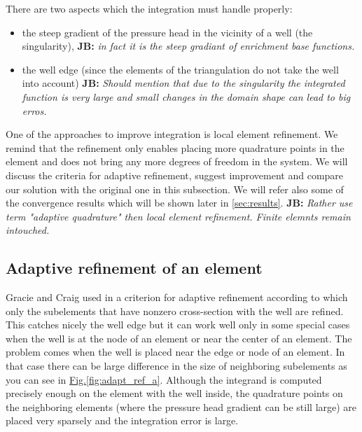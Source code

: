 \documentclass[preprint,12pt]{elsarticle}
\newcommand{\fig}[1]{\hyperref[#1]{Fig.\ref{#1}}}
\newcommand{\noteJB}[1]{{\color{Blue} \textbf{JB: } \textit{#1}}}
\newcommand{\notePE}[1]{{\color{Orange} \textbf{PE: } \textit{#1}}}
\begin{document}
There are two aspects which the integration must handle properly:
\begin{itemize}
  \item the steep gradient of the pressure head in the vicinity of a well (the singularity),
  \noteJB{in fact it is the steep gradiant of enrichment base functions.}
  \item the well edge (since the elements of the triangulation do not take the well into account)
  \noteJB{Should mention that due to the singularity the integrated function is very large and small changes in the domain shape can lead to big erros.}
\end{itemize}

One of the approaches to improve integration is local element refinement. We remind that the refinement only enables
placing more quadrature points in the element and does not bring any more degrees of freedom in the 
system. We will discuss the criteria for adaptive refinement, suggest improvement and compare our solution
with the original one in this subsection. We will refer also some of the convergence results which will be 
shown later in \ref{sec:results}.
\noteJB{Rather use term "adaptive quadrature" then local element refinement. Finite elemnts remain intouched.}

\subsection{Adaptive refinement of an element}
\label{sec:refinement_element}

Gracie and Craig used in \cite{gracie} a criterion for adaptive refinement according to which only the subelements 
that have nonzero cross-section with the well are refined. This catches nicely the well edge but it can work 
well only in some special cases when the well is at the node of an element or near the center of an element. 
The problem comes when the well is placed near the edge or node of an element. In that case there can be
large difference in the size of neighboring subelements as you can see in \fig{fig:adapt_ref_a}. Although
the integrand is computed precisely enough on the element with the well inside, the quadrature points on the
neighboring elements (where the pressure head gradient can be still large) are placed very sparsely 
and the integration error is large.
\end{document}
